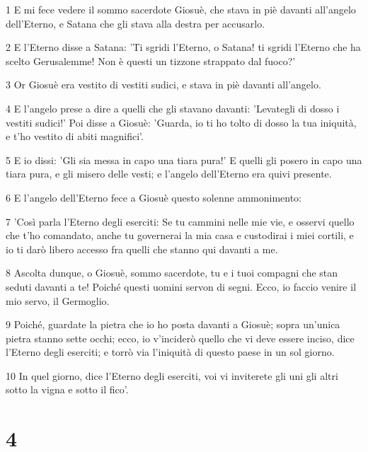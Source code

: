 \par 1 E mi fece vedere il sommo sacerdote Giosuè, che stava in piè davanti all'angelo dell'Eterno, e Satana che gli stava alla destra per accusarlo.
\par 2 E l'Eterno disse a Satana: 'Ti sgridi l'Eterno, o Satana! ti sgridi l'Eterno che ha scelto Gerusalemme! Non è questi un tizzone strappato dal fuoco?'
\par 3 Or Giosuè era vestito di vestiti sudici, e stava in piè davanti all'angelo.
\par 4 E l'angelo prese a dire a quelli che gli stavano davanti: 'Levategli di dosso i vestiti sudici!' Poi disse a Giosuè: 'Guarda, io ti ho tolto di dosso la tua iniquità, e t'ho vestito di abiti magnifici'.
\par 5 E io dissi: 'Gli sia messa in capo una tiara pura!' E quelli gli posero in capo una tiara pura, e gli misero delle vesti; e l'angelo dell'Eterno era quivi presente.
\par 6 E l'angelo dell'Eterno fece a Giosuè questo solenne ammonimento:
\par 7 'Così parla l'Eterno degli eserciti: Se tu cammini nelle mie vie, e osservi quello che t'ho comandato, anche tu governerai la mia casa e custodirai i miei cortili, e io ti darò libero accesso fra quelli che stanno qui davanti a me.
\par 8 Ascolta dunque, o Giosuè, sommo sacerdote, tu e i tuoi compagni che stan seduti davanti a te! Poiché questi uomini servon di segni. Ecco, io faccio venire il mio servo, il Germoglio.
\par 9 Poiché, guardate la pietra che io ho posta davanti a Giosuè; sopra un'unica pietra stanno sette occhi; ecco, io v'inciderò quello che vi deve essere inciso, dice l'Eterno degli eserciti; e torrò via l'iniquità di questo paese in un sol giorno.
\par 10 In quel giorno, dice l'Eterno degli eserciti, voi vi inviterete gli uni gli altri sotto la vigna e sotto il fico'.

\chapter{4}

